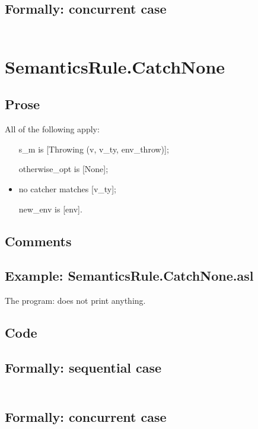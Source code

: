 \documentclass{book}
\begin{document}
  \subsection{Formally: concurrent case}
  \begin{align}
  \end{align} 

\section{SemanticsRule.CatchNone \label{sec:SemanticsRule.CatchNone}}

    \subsection{Prose}
    All of the following apply:
    \begin{itemize}
    \item [s\_m] is [Throwing (v, v\_ty, env\_throw)];
    \item [otherwise\_opt] is [None];
    \item no catcher matches [v\_ty];
    \item [new\_env] is [env].
    \end{itemize}

    \subsection{Comments}

    \subsection{Example: SemanticsRule.CatchNone.asl}
    The program:
    does not print anything.

  \subsection{Code}

  \subsection{Formally: sequential case}
  \begin{align}
  \end{align} 

  \subsection{Formally: concurrent case}
  \begin{align}
  \end{align} 
\end{document}
